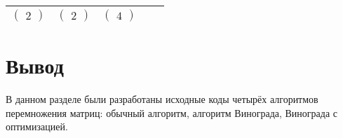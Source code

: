 \begin{table}[h]
\begin{center}
\begin{tabular}{|c|c|c|c|c|}
		$\begin{pmatrix}
			2
		\end{pmatrix}$ &
		$\begin{pmatrix}
			2
		\end{pmatrix}$ &
		$\begin{pmatrix}
			4
		\end{pmatrix}$ \\ \hline

		\end{tabular}
	\end{center}
\end{table}


\section*{Вывод}

В данном разделе были разработаны исходные коды четырёх алгоритмов перемножения матриц: обычный алгоритм, алгоритм Винограда, Винограда с оптимизацией.
